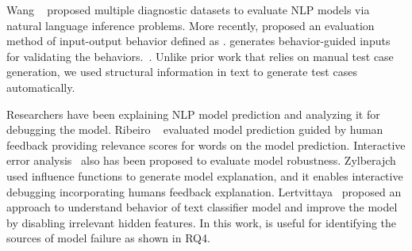 %
Wang \textit{\etal}~\cite{wang2018glue, wang2019superglue} proposed
multiple diagnostic datasets to evaluate NLP models 
via natural language inference problems. More recently, \Cklst proposed an evaluation
method of input-output behavior defined as \lcs. \Cklst generates
behavior-guided inputs for validating the
behaviors.~\cite{marcoACL2020checklist}. Unlike prior work that relies on manual
test case generation, we used structural information in text to
generate test cases automatically.

%
Researchers have been explaining NLP model prediction and
analyzing it for debugging the model. Ribeiro
\textit{\etal}~\cite{ribeiroSG16lime} evaluated model prediction guided by human feedback providing relevance scores for words on the model prediction. 
Interactive error analysis~\cite{wu2019errudite} also has been proposed to evaluate
model robustness. Zylberajch~\cite{zylberajch2021hildif} used influence functions to generate model explanation, and it enables interactive debugging incorporating humans feedback
explanation.
Lertvittaya~\cite{lertvittayakumjorn2020find} proposed
an approach to understand behavior of text classifier model and improve the
model by disabling irrelevant hidden features. In this work, \tool
is useful for identifying the sources of model failure as shown in RQ4.






